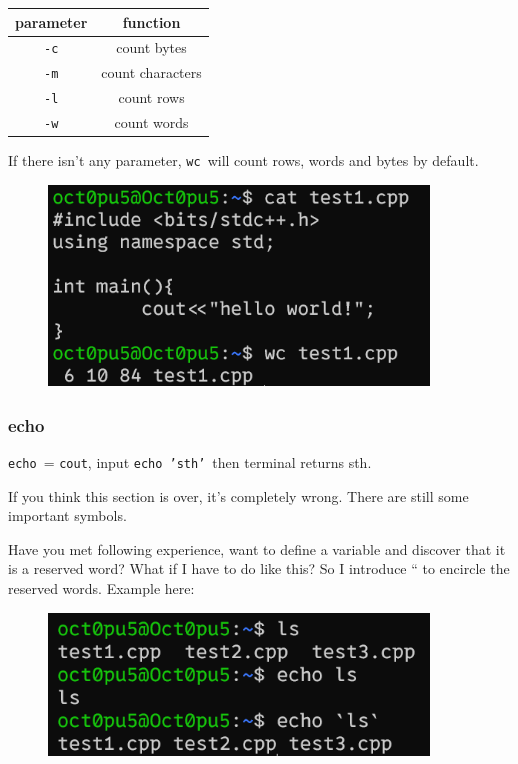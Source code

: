 \documentclass[12pt]{ctexart}
\begin{document}
\begin{table}[H]
    \centering
    \begin{tabular}{cc}
    \toprule
    parameter & function \\
    \midrule
    \texttt{-c} & count bytes \\
    \texttt{-m} & count characters \\
    \texttt{-l} & count rows \\
    \texttt{-w} & count words \\
    \bottomrule
    \end{tabular}
\end{table}

If there isn't any parameter, \texttt{wc}\ will count
rows, words and bytes by default.

\begin{figure}[H]
    \centering
    \includegraphics[width=0.9\textwidth,keepaspectratio]{assets/Linux/1.5 Linux file commands/12.png}
\end{figure}

\subsubsection{\textbf{echo}}

\texttt{echo}\ = \texttt{cout}, input \texttt{echo\ 'sth'}\ then terminal
returns sth.

If you think this section is over, it's completely
wrong. There are still some important symbols.

Have you met following experience, want to define a variable and
discover that it is a reserved word? What if I have to do like this? So
I introduce `` to encircle the reserved words. Example here:

\begin{figure}[H]
    \centering
    \includegraphics[width=0.9\textwidth,keepaspectratio]{assets/Linux/1.5 Linux file commands/13.png}
\end{figure}
\end{document}
